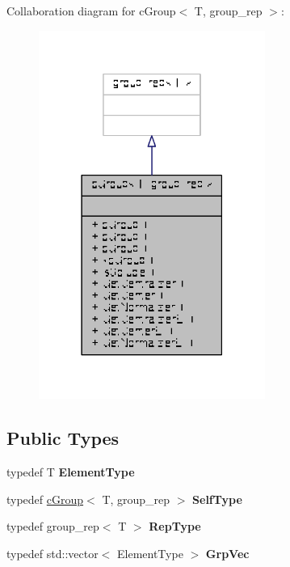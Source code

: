 Collaboration diagram for c\-Group$<$ T, group\-\_\-rep $>$\-:
\nopagebreak
\begin{figure}[H]
\begin{center}
\leavevmode
\includegraphics[width=210pt]{classcGroup__coll__graph}
\end{center}
\end{figure}
\subsection*{Public Types}
\begin{DoxyCompactItemize}
\item 
\hypertarget{classcGroup_abf5ed8f308bc05dbbb75b1f2ccb3bf18}{typedef T {\bfseries Element\-Type}}\label{classcGroup_abf5ed8f308bc05dbbb75b1f2ccb3bf18}

\item 
\hypertarget{classcGroup_a8c16d6d9eb0d68d286505528c1e94d3a}{typedef \hyperlink{classcGroup}{c\-Group}$<$ T, group\-\_\-rep $>$ {\bfseries Self\-Type}}\label{classcGroup_a8c16d6d9eb0d68d286505528c1e94d3a}

\item 
\hypertarget{classcGroup_a8752843a8e5c6d23411de90d4e1a1f51}{typedef group\-\_\-rep$<$ T $>$ {\bfseries Rep\-Type}}\label{classcGroup_a8752843a8e5c6d23411de90d4e1a1f51}

\item 
\hypertarget{classcGroup_aa233178cfb06c6c59df798ff40fce156}{typedef std\-::vector$<$ Element\-Type $>$ {\bfseries Grp\-Vec}}\label{classcGroup_aa233178cfb06c6c59df798ff40fce156}

\end{DoxyCompactItemize}
